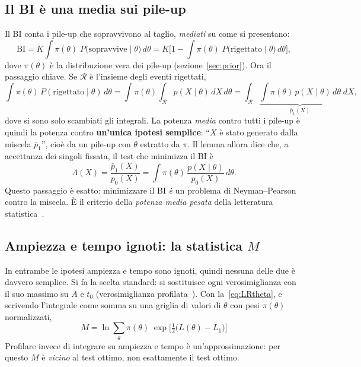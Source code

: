 \documentclass[11pt,a4paper]{article}
\begin{document}
\subsection{Il BI è una media sui pile-up}
Il BI conta i pile-up che sopravvivono al taglio, \emph{mediati} su come si presentano:
\begin{equation}
  \mathrm{BI} = K \int \pi(\theta)\; P\big(\text{sopravvive}\mid\theta\big)\, d\theta
  = K\Big[1 - \int \pi(\theta)\; P\big(\text{rigettato}\mid\theta\big)\, d\theta\Big],
\end{equation}
dove $\pi(\theta)$ è la distribuzione vera dei pile-up (sezione~\ref{sec:prior}). Ora il passaggio
chiave. Se $\mathcal{R}$ è l'insieme degli eventi rigettati,
\begin{equation}
  \int \pi(\theta)\, P(\text{rigettato}\mid\theta)\, d\theta
  = \int \pi(\theta) \int_{\mathcal{R}} p(X\mid\theta)\, dX\, d\theta
  = \int_{\mathcal{R}} \underbrace{\int \pi(\theta)\, p(X\mid\theta)\, d\theta}_{\bar p_1(X)}\; dX ,
\end{equation}
dove si sono solo scambiati gli integrali. La potenza \emph{media} contro tutti i pile-up è quindi
la potenza contro \textbf{un'unica ipotesi semplice}: ``$X$ è stato generato dalla miscela
$\bar p_1$'', cioè da un pile-up con $\theta$ estratto da $\pi$. Il lemma allora dice che, a
accettanza dei singoli fissata, il test che minimizza il BI è
\begin{equation}
  \Lambda(X) = \frac{\bar p_1(X)}{p_0(X)} = \int \pi(\theta)\, \frac{p(X\mid\theta)}{p_0(X)}\, d\theta .
  \label{eq:Lambda}
\end{equation}
Questo passaggio è esatto: minimizzare il BI \emph{è} un problema di Neyman--Pearson contro la
miscela. È il criterio della \emph{potenza media pesata} della letteratura
statistica~\cite{Wald1943,AndrewsPloberger1994}.

\subsection{Ampiezza e tempo ignoti: la statistica $M$}
In entrambe le ipotesi ampiezza e tempo sono ignoti, quindi nessuna delle due è davvero semplice.
Si fa la scelta standard: si sostituisce ogni verosimiglianza con il suo massimo su $A$ e
$t_0$ (verosimiglianza profilata~\cite{CCGV2011}). Con la~\eqref{eq:LRtheta}, e scrivendo
l'integrale come somma su una griglia di valori di $\theta$ con pesi $\pi(\theta)$ normalizzati,
\begin{equation}
  \boxed{\; M = \ln \sum_{\theta} \pi(\theta)\; \exp\!\Big[\tfrac12\big(L(\theta) - L_1\big)\Big] \;}
  \label{eq:M}
\end{equation}
Profilare invece di integrare su ampiezza e tempo è un'approssimazione: per questo $M$ è
\emph{vicino} al test ottimo, non esattamente il test ottimo.
\end{document}
